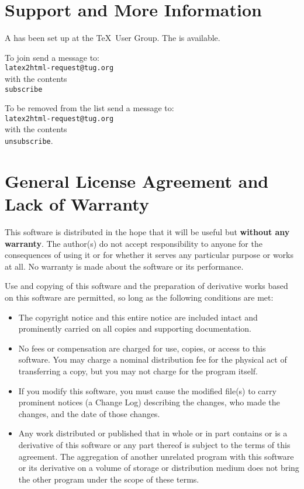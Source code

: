 
\section{Support and More Information}

A  has been set up at the \TeX\ User Group. The
 is
available.

To join send a message to: \\
\texttt{latex2html-request@tug.org}  \\
with the contents \\
\texttt{subscribe}

To be removed from the list send a message to: \\
\texttt{latex2html-request@tug.org}  \\
with the contents \\
\texttt{unsubscribe}.

\section{General License Agreement and Lack of Warranty}
This software is distributed in the hope that it will be useful
but \textbf{without any warranty}. The author(s) do not accept responsibility 
to anyone for the consequences of using it or for whether it serves 
any particular purpose or works at all. No warranty is made about 
the software or its performance. 
 
Use and copying of this software and the preparation of derivative
works based on this software are permitted, so long as the following
conditions are met:
\begin{itemize}
\item The copyright notice and this entire notice are included intact
and prominently carried on all copies and supporting documentation.
\item No fees or compensation are charged for use, copies, or
access to this software. You may charge a nominal
distribution fee for the physical act of transferring a
copy, but you may not charge for the program itself. 
\item If you modify this software, you must cause the modified
file(s) to carry prominent notices (a Change Log)
describing the changes, who made the changes, and the date
of those changes.
\item  Any work distributed or published that in whole or in part
contains or is a derivative of this software or any part 
thereof is subject to the terms of this agreement. The 
aggregation of another unrelated program with this software
or its derivative on a volume of storage or distribution
medium does not bring the other program under the scope
of these terms.
\end{itemize}
 
